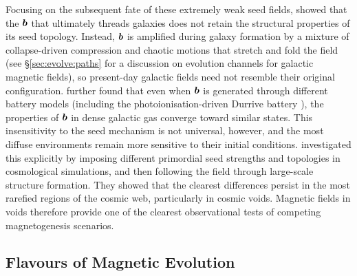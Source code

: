 Focusing on the subsequent fate of these extremely weak seed fields, \citet{garaldi2021magnetogenesis} showed that the $\bm{b}$ that ultimately threads galaxies does not retain the structural properties of its seed topology. Instead, $\bm{b}$ is amplified during galaxy formation by a mixture of collapse-driven compression and chaotic motions that stretch and fold the field (see \S\ref{sec:evolve:paths} for a discussion on evolution channels for galactic magnetic fields), so present-day galactic fields need not resemble their original configuration. \citet{garaldi2021magnetogenesis} further found that even when $\bm{b}$ is generated through different battery models (including the photoionisation-driven Durrive battery \citep{durrive2015intergalactic}), the properties of $\bm{b}$ in dense galactic gas converge toward similar states. This insensitivity to the seed mechanism is not universal, however, and the most diffuse environments remain more sensitive to their initial conditions. \citet{mtchedlidze2022evolution} investigated this explicitly by imposing different primordial seed strengths and topologies in cosmological simulations, and then following the field through large-scale structure formation. They showed that the clearest differences persist in the most rarefied regions of the cosmic web, particularly in cosmic voids. Magnetic fields in voids therefore provide one of the clearest observational tests of competing magnetogenesis scenarios.

\subsection{Flavours of Magnetic Evolution}
\label{sec:evolve}

